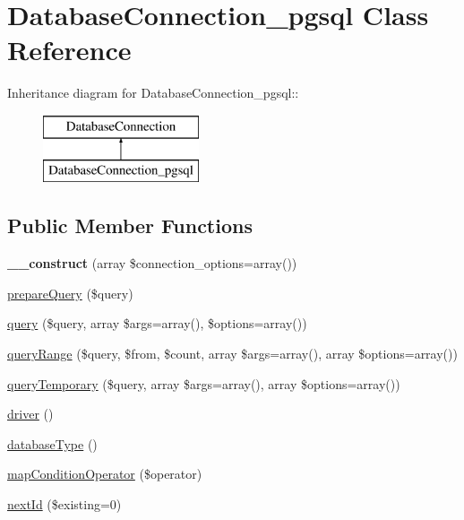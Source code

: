 \hypertarget{classDatabaseConnection__pgsql}{
\section{DatabaseConnection\_\-pgsql Class Reference}
\label{classDatabaseConnection__pgsql}
}
Inheritance diagram for DatabaseConnection\_\-pgsql::\begin{figure}[H]
\begin{center}
\leavevmode
\includegraphics[height=2cm]{classDatabaseConnection__pgsql}
\end{center}
\end{figure}
\subsection*{Public Member Functions}
\begin{DoxyCompactItemize}
\item 
\hypertarget{classDatabaseConnection__pgsql_a750d21f874200b6801cbce9adac44421}{
{\bfseries \_\-\_\-construct} (array \$connection\_\-options=array())}
\label{classDatabaseConnection__pgsql_a750d21f874200b6801cbce9adac44421}

\item 
\hyperlink{classDatabaseConnection__pgsql_aa777c52e9403cc39e355ede640a5cb4a}{prepareQuery} (\$query)
\item 
\hyperlink{classDatabaseConnection__pgsql_aa03d55a2837d71b3e832102447bc815f}{query} (\$query, array \$args=array(), \$options=array())
\item 
\hyperlink{classDatabaseConnection__pgsql_aabdd2246a4122962112ff37ab080eee7}{queryRange} (\$query, \$from, \$count, array \$args=array(), array \$options=array())
\item 
\hyperlink{classDatabaseConnection__pgsql_a4256f910e0d93f1fc28ea65aa1f1f145}{queryTemporary} (\$query, array \$args=array(), array \$options=array())
\item 
\hyperlink{classDatabaseConnection__pgsql_a60af8084115491a30ae1b6ee3552a958}{driver} ()
\item 
\hyperlink{classDatabaseConnection__pgsql_ad8e8147530abb85983d9cfdce5d0808c}{databaseType} ()
\item 
\hyperlink{classDatabaseConnection__pgsql_a71d8b6a2d7d97b3e194126abe714900f}{mapConditionOperator} (\$operator)
\item 
\hyperlink{classDatabaseConnection__pgsql_a6098b360df35fec77fd8240348eb6659}{nextId} (\$existing=0)
\end{DoxyCompactItemize}


